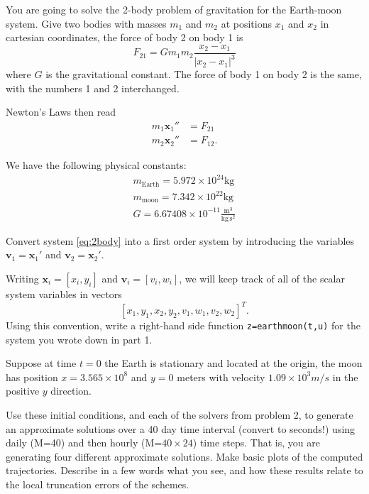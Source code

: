 \documentclass[minion]{homework}
\newcommand{\bfx}{\mathbf{x}}
\newcommand{\bfv}{\mathbf{v}}
\begin{document}
\begin{problems}
\problem You are going to solve the 2-body problem of gravitation for the Earth-moon system.  Give two bodies with masses $m_1$ and $m_2$
at positions $x_1$ and $x_2$ in cartesian coordinates,
the force of body 2 on body 1 is
\[
F_{21} = G m_1 m_2 \frac{x_2-x_1}{|x_2-x_1|^3}
\]
where $G$ is the gravitational constant.  The force of body 1 on body 2
is the same, with the numbers 1 and 2 interchanged.

Newton's Laws then read
\begin{equation}
\begin{aligned}
\label{eq:2body}
m_1 \bfx_1'' &= F_{21}\\
m_2 \bfx_2'' &= F_{12}.
\end{aligned}
\end{equation}

We have the following physical constants:
\begin{align*}
m_{\text{Earth}} = 5.972 \times 10^{24} \mathrm{kg}\\
m_{\text{moon}} =  7.342 \times 10^{22} \mathrm{kg}\\
G = 6.67408 \times 10^{-11} \frac{ \mathrm{m}^3 }{ \mathrm{kg} \, \mathrm{s}^2}
\end{align*}

\begin{subproblems}
\item Convert system \eqref{eq:2body} into a first order system by
introducing the variables $\bfv_1=\bfx_1'$ and $\bfv_2=\bfx_2'$.
\item Writing $\bfx_i = [x_i,y_i]$ and $\bfv_i=[v_i,w_i]$, 
we will keep track of all of the scalar system variables
in vectors
\[
[x_1,y_1,x_2,y_2,v_1,w_1,v_2,w_2]^T.
\]
Using this convention, write a right-hand side 
function \texttt{z=earthmoon(t,u)} for the system you wrote 
down in part 1. 
\item Suppose at time $t=0$ the Earth is stationary and located
at the origin, the moon has position $x=3.565 \times 10^8$
and $y=0$ meters with velocity $1.09 \times 10^3 m/s$ in
the positive $y$ direction.

Use these initial conditions, and each of the solvers from problem 2, to generate an approximate solutions over a 40 day time interval (convert to seconds!) using daily (M=40) and then hourly (M=$40\times24$) time steps. That is, you are generating four different approximate
solutions.  Make basic plots of the computed trajectories.
 Describe in a few words what you see, and how these results relate to the local truncation errors of the schemes.


\end{subproblems}
\end{problems}
\end{document}
